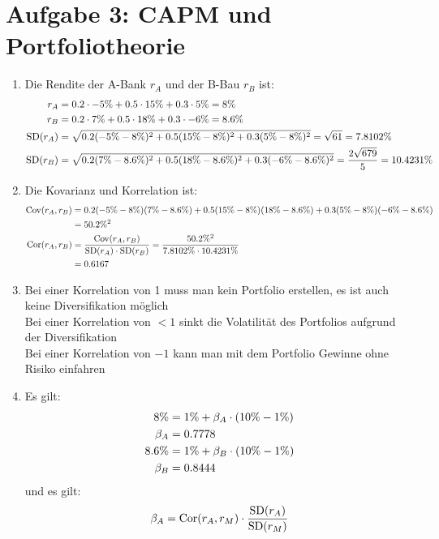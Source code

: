 \documentclass{article}
\DeclareMathOperator{\Cov}{Cov}
\DeclareMathOperator{\SD}{SD}
\DeclareMathOperator{\Cor}{Cor}
\begin{document}
	\section*{Aufgabe 3: CAPM und Portfoliotheorie}
	\begin{enumerate}[label=(\alph*)]
		\item Die Rendite der A-Bank $r_A$ und der B-Bau $r_B$ ist:
		\begin{align}
			r_A &= 0.2\cdot -5\% + 0.5\cdot 15\% + 0.3\cdot 5\% = 8\% \notag \\
			r_B &= 0.2\cdot 7\% + 0.5\cdot 18\% + 0.3\cdot -6\% = 8.6\% \notag \\
			\SD(r_A) &= \sqrt{0.2(-5\% - 8\%)^2 + 0.5(15\% - 8\%)^2 + 0.3(5\% - 8\%)^2} = \sqrt{61} = 7.8102\% \notag \\
			\SD(r_B) &= \sqrt{0.2(7\% - 8.6\%)^2 + 0.5(18\% - 8.6\%)^2 + 0.3(-6\% - 8.6\%)^2} = \frac{2\sqrt{679}}{5} = 10.4231\% \notag
		\end{align}
		\item Die Kovarianz und Korrelation ist:
		\begin{align}
			\Cov(r_A,r_B) &= 0.2(-5\% - 8\%)(7\% - 8.6\%) + 0.5(15\% - 8\%)(18\% - 8.6\%) + 0.3(5\% - 8\%)(-6\% - 8.6\%) \notag \\
			&= 50.2\%^2 \notag \\
			\Cor(r_A,r_B) &= \frac{\Cov(r_A,r_B)}{\SD(r_A)\cdot \SD(r_B)} = \frac{50.2\%^2}{7.8102\%\cdot 10.4231\%} \notag \\
			&= 0.6167 \notag
		\end{align}
		\item Bei einer Korrelation von 1 muss man kein Portfolio erstellen, es ist auch keine Diversifikation möglich \\
		Bei einer Korrelation von $<1$ sinkt die Volatilität des Portfolios aufgrund der Diversifikation \\
		Bei einer Korrelation von $-1$ kann man mit dem Portfolio Gewinne ohne Risiko einfahren
		\item Es gilt:
		\begin{align}
			8\% &= 1\% + \beta_A\cdot (10\% - 1\%) \notag \\
			\beta_A &= 0.7778 \notag \\
			8.6\% &= 1\% + \beta_B\cdot (10\% - 1\%) \notag \\
			\beta_B &= 0.8444 \notag
		\end{align}
		und es gilt:
		\begin{align}
			\beta_A &= \Cor(r_A, r_M)\cdot\frac{\SD(r_A)}{\SD(r_M)} \notag \\

\end{align}
\end{enumerate}
\end{document}
